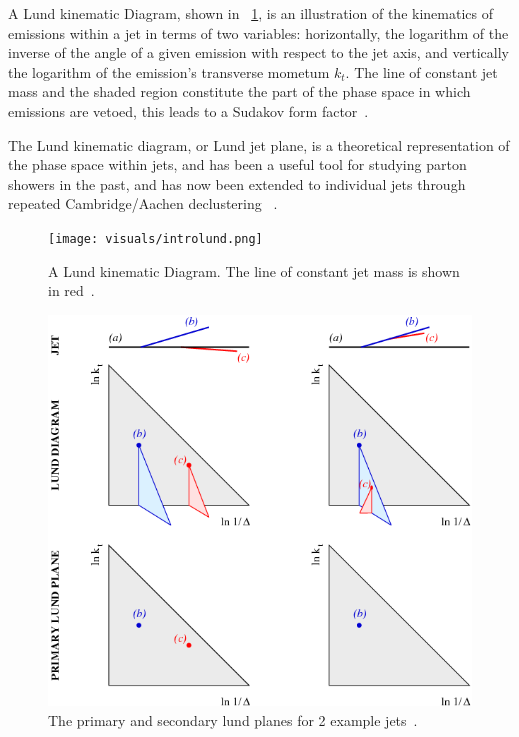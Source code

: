 A Lund kinematic Diagram, shown in  ~\ref{fig:introlund}, is an illustration of the kinematics of emissions within a jet in terms of two variables: horizontally, the logarithm of the inverse of the angle of a given emission with respect to the jet axis, and vertically the logarithm of the emission's transverse mometum $k_t$. The line of constant jet mass and the shaded region constitute the part of the phase space in which emissions are vetoed, this leads to a Sudakov form factor~\cite{mmdt}.

The Lund kinematic diagram, or Lund jet plane, is a theoretical representation of the phase space within jets, and has been a useful tool for studying parton showers in the past, and has now been extended to individual jets through repeated Cambridge/Aachen declustering ~\cite{Dreyer:2018nbf}.



\begin{figure}[htb]
\centering
\texttt{[image: visuals/introlund.png]}
\caption{A Lund kinematic Diagram. The line of constant jet mass is shown in red~\cite{mmdt}.  }
\label{fig:introlund}
\end{figure}



\begin{figure}[htb]
\centering
\includegraphics[width=1.0\textwidth]{visuals/figs_lund.png}
\caption{The primary and secondary lund planes for 2 example jets~\cite{Dreyer:2018nbf}.}
\label{fig:lundPrimaryandSecondary}
\end{figure}


